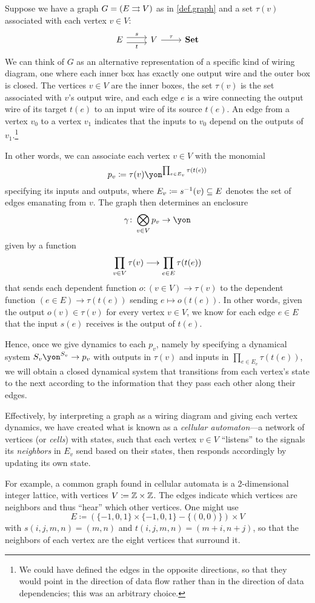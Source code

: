 \documentclass[Book-Poly]{subfiles}
\begin{document}
\begin{example}\label{ex.graph_interaction}
Suppose we have a graph $G=(E\rightrightarrows V)$ as in \cref{def.graph} and a set $\tau(v)$ associated with each vertex $v\in V$:
\[
\begin{tikzcd}
	E\ar[r, shift left=3pt, "s"]\ar[r, shift right=3pt, "t"']&
	V\ar[r, "\tau"]&
	\smset
\end{tikzcd}
\]
We can think of $G$ as an alternative representation of a specific kind of wiring diagram, one where each inner box has exactly one output wire and the outer box is closed.
The vertices $v\in V$ are the inner boxes, the set $\tau(v)$ is the set associated with $v$'s output wire, and each edge $e$ is a wire connecting the output wire of its target $t(e)$ to an input wire of its source $t(e)$.
An edge from a vertex $v_0$ to a vertex $v_1$ indicates that the inputs to $v_0$ depend on the outputs of $v_1$.\footnote{We could have defined the edges in the opposite directions, so that they would point in the direction of data flow rather than in the direction of data dependencies; this was an arbitrary choice.}

In other words, we can associate each vertex $v\in V$ with the monomial
\[
	p_v\coloneqq\tau(v)\yon^{\prod_{e\in E_v}\tau(t(e))}
\]
specifying its inputs and outputs, where $E_v\coloneqq s^{-1}(v)\subseteq E$ denotes the set of edges emanating from $v$.
The graph then determines an enclosure
\[
\gamma\colon\bigotimes_{v\in V}p_v\to\yon
\]
given by a function
\[
    \prod_{v\in V}\tau(v)\longrightarrow\prod_{e\in E}\tau(t(e))
\]
that sends each dependent function $o\colon(v\in V)\to\tau(v)$ to the dependent function $(e\in E)\to\tau(t(e))$ sending $e\mapsto o(t(e))$.
In other words, given the output $o(v)\in\tau(v)$ for every vertex $v\in V$, we know for each edge $e\in E$ that the input $s(e)$ receives is the output of $t(e)$.

Hence, once we give dynamics to each $p_v$, namely by specifying a dynamical system $S_v\yon^{S_v}\to p_v$ with outputs in $\tau(v)$ and inputs in $\prod_{e\in E_v}\tau(t(e))$, we will obtain a closed dynamical system that transitions from each vertex's state to the next according to the information that they pass each other along their edges.

Effectively, by interpreting a graph as a wiring diagram and giving each vertex dynamics, we have created what is known as a \emph{cellular automaton}---a network of vertices (or \emph{cells}) with states, such that each vertex $v\in V$ ``listens'' to the signals its \emph{neighbors} in $E_v$ send based on their states, then responds accordingly by updating its own state.

For example, a common graph found in cellular automata is a 2-dimensional integer lattice, with vertices $V\coloneqq\mathbb{Z}\times\mathbb{Z}$. The edges indicate which vertices are neighbors and thus ``hear'' which other vertices. One might use
\[E\coloneqq(\{-1,0,1\}\times\{-1,0,1\}-\{(0,0)\})\times V\]
with $s(i,j,m,n)=(m,n)$ and $t(i,j,m,n)=(m+i, n+j)$, so that the neighbors of each vertex are the eight vertices that surround it.
\end{example}
\end{document}
